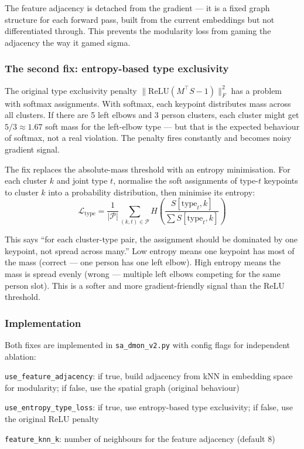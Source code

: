 The feature adjacency is detached from the gradient --- it is a fixed graph structure for each forward pass, built from the current embeddings but not differentiated through. This prevents the modularity loss from gaming the adjacency the way it gamed sigma.


\subsubsection{The second fix: entropy-based type exclusivity}

The original type exclusivity penalty $\|\text{ReLU}(M^\top S - 1)\|_F^2$ has a problem with softmax assignments. With softmax, each keypoint distributes mass across all clusters. If there are 5 left elbows and 3 person clusters, each cluster might get $5/3 \approx 1.67$ soft mass for the left-elbow type --- but that is the expected behaviour of softmax, not a real violation. The penalty fires constantly and becomes noisy gradient signal.

The fix replaces the absolute-mass threshold with an entropy minimisation. For each cluster $k$ and joint type $t$, normalise the soft assignments of type-$t$ keypoints to cluster $k$ into a probability distribution, then minimise its entropy:
\[
\mathcal{L}_{\text{type}} = \frac{1}{|\mathcal{P}|} \sum_{(k,t) \in \mathcal{P}} H\left(\frac{S[\text{type}_t, k]}{\sum S[\text{type}_t, k]}\right)
\]

This says ``for each cluster-type pair, the assignment should be dominated by one keypoint, not spread across many.'' Low entropy means one keypoint has most of the mass (correct --- one person has one left elbow). High entropy means the mass is spread evenly (wrong --- multiple left elbows competing for the same person slot). This is a softer and more gradient-friendly signal than the ReLU threshold.


\subsubsection{Implementation}

Both fixes are implemented in \texttt{sa\_dmon\_v2.py} with config flags for independent ablation:
\begin{compactitem}
  \item \texttt{use\_feature\_adjacency}: if true, build adjacency from kNN in embedding space for modularity; if false, use the spatial graph (original behaviour)
  \item \texttt{use\_entropy\_type\_loss}: if true, use entropy-based type exclusivity; if false, use the original ReLU penalty
  \item \texttt{feature\_knn\_k}: number of neighbours for the feature adjacency (default 8)
\end{compactitem}

